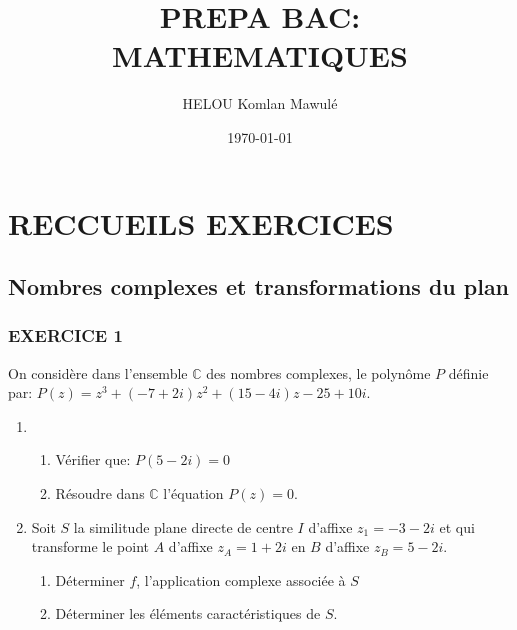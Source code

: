\documentclass[12pts]{book}
\author{HELOU Komlan Mawulé}
\date{\today}
\title{PREPA BAC: MATHEMATIQUES}
\begin{document}
	\maketitle
	\part{RECCUEILS EXERCICES}
	\chapter{Nombres complexes et transformations du plan}
	\section*{EXERCICE 1}
		On considère dans l'ensemble $\mathbb{C}$ des nombres complexes, le polynôme $P$ définie par: $P(z)=z^3+(-7+2i)z^2+(15-4i)z-25+10i$.
		\begin{enumerate}
			\item 
				\begin{enumerate}
					\item Vérifier que: $P(5-2i)=0$
					\item Résoudre dans $\mathbb{C}$ l'équation $P(z)=0$.
				\end{enumerate}
			\item \begin{enumerate}
					Soit $S$ la similitude plane directe de centre $I$ d'affixe $z_1=-3-2i$ et qui transforme le point $A$ d'affixe $z_A=1+2i$ en $B$ d'affixe $z_B=5-2i$.
					\begin{enumerate}
						\item Déterminer $f$, l'application complexe associée à $S$
						\item Déterminer les éléments caractéristiques de $S$.
					\end{enumerate}
				\end{enumerate}
		\end{enumerate}
	
\end{document}
